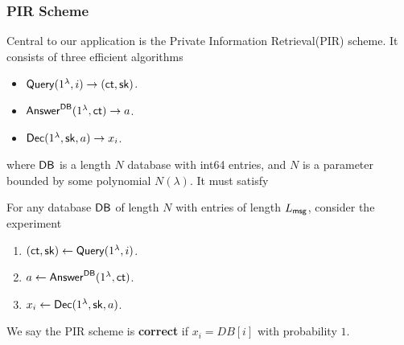 \subsubsection{PIR Scheme}
\label{subsec:PIR}
Central to our application is the Private Information Retrieval(PIR) scheme. It consists of three efficient algorithms
\begin{itemize}
    \item $\mathsf{Query}(1^{\lambda}, i) \to (\mathsf{ct}, {\mathsf{sk}})$.
    \item $\mathsf{Answer}^{\mathsf{DB}}(1^{\lambda}, \mathsf{ct}) \to a$.
    \item $\mathsf{Dec}(1^{\lambda}, {\mathsf{sk}}, a) \to x_i$.
\end{itemize}
where $\mathsf{DB}$ is a length $N$ database with int64 entries, and $N$ is a parameter bounded by some polynomial $N(\lambda)$. It must satisfy
\begin{definition}
\label{defn:PIR-correctness}
For any database $\mathsf{DB}$ of length $N$ with entries of length $L_{\mathsf{msg}}$, consider the experiment
\begin{enumerate}
    \item $(\mathsf{ct}, {\mathsf{sk}}) \leftarrow \mathsf{Query}(1^{\lambda}, i)$.
    \item $a \leftarrow \mathsf{Answer}^{\mathsf{DB}}(1^{\lambda}, \mathsf{ct})$.
    \item $x_i \leftarrow \mathsf{Dec}(1^{\lambda}, {\mathsf{sk}}, a)$.
\end{enumerate}
We say the PIR scheme is \textbf{correct} if $x_i = DB[i]$ with probability $1$.
\end{definition}
